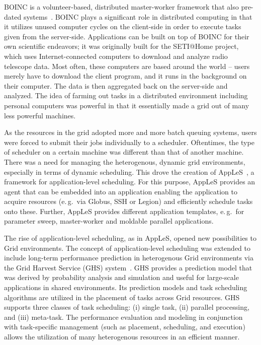 \documentclass{sig-alternate}
\begin{document}
BOINC is a volunteer-based, distributed master-worker framework that also pre-dated \pilotjob systems~\cite{Anderson:2004:BSP:1032646.1033223}. BOINC plays a significant
role in distributed computing in that it utilizes unused computer cycles on the client-side in order to
execute tasks given from the server-side. Applications can be built on
top of BOINC for their own scientific endeavors; it was originally
built for the SETI@Home project, which uses Internet-connected
computers to download and analyze radio telescope data. Most often,
these computers are based around the world -- users merely have to
download the client program, and it runs in the background on their
computer. The data is then aggregated back on the server-side and
analyzed. The idea of farming out tasks in a distributed environment
including personal computers was powerful in that it essentially made a grid 
out of many less powerful machines.

As the resources in the grid adopted more and more batch queuing
systems, users were forced to submit their jobs individually to a
scheduler. Oftentimes, the type of scheduler on a certain machine was
different than that of another machine. There was a need for managing
the heterogenous, dynamic grid environments, especially in terms of
dynamic scheduling. This drove the creation of
AppLeS~\cite{Berman:2003:ACG:766629.766632}, a framework for
application-level scheduling. For this purpose, AppLeS provides an
agent that can be embedded into an application enabling the
application to acquire resources (e.\,g.\ via Globus, SSH or Legion)
and efficiently schedule tasks onto these. Further, AppLeS provides
different application templates, e.\,g.\ for parameter sweep,
master-worker and moldable parallel applications.

The rise of application-level scheduling, as in AppLeS, opened new possibilities to Grid environments. The concept of application-level scheduling was extended to include long-term performance prediction in heterogenous Grid environments via the Grid Harvest Service (GHS) system~\cite{ghs}. GHS provides a prediction model that was derived by probability analysis and simulation and useful for large-scale applications in shared environments. Its prediction models and task scheduling algorithms are utilized in the placement of tasks across Grid resources. GHS supports three classes of task scheduling: (i) single task, (ii) parallel processing, and (iii) meta-task. The performance evaluation and modeling in conjunction with task-specific management (such as placement, scheduling, and execution) allows the utilization of many heterogenous resources in an efficient manner.
\end{document}
